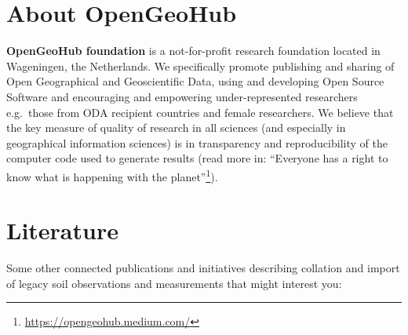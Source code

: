 \documentclass[
  graybox,natbib,nospthms]{svmono}
\renewcommand{\href}[2]{#2 (\url{#1})}
\renewcommand{\href}[2]{#2\footnote{\url{#1}}}
\begin{document}
\hypertarget{about-opengeohub}{%
\section{About OpenGeoHub}\label{about-opengeohub}}

\textbf{OpenGeoHub foundation} is a not-for-profit research foundation
located in Wageningen, the Netherlands. We specifically promote
publishing and sharing of Open Geographical and Geoscientific Data,
using and developing Open Source Software and encouraging and empowering
under-represented researchers e.g.~those from ODA recipient countries
and female researchers. We believe that the key measure of quality of
research in all sciences (and especially in geographical information
sciences) is in transparency and reproducibility of the computer code
used to generate results (read more in: \href{https://opengeohub.medium.com/}{``Everyone has a right to know
what is happening with the planet''}).

\hypertarget{literature}{%
\section{Literature}\label{literature}}

Some other connected publications and initiatives describing collation
and import of legacy soil observations and measurements that might interest
you:
\end{document}
